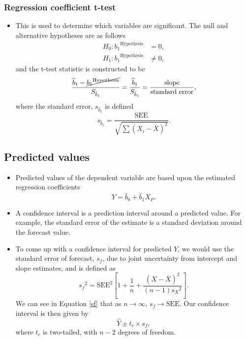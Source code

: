 \documentclass[../notes_compiled.tex]{subfiles}
\begin{document}
\subsubsection{Regression coefficient t-test}
\begin{itemize}
\item This is used to determine which variables are significant. The null and alternative hypotheses are as follows
\begin{align*}
H_{0}: {b_{1}}^{\text{Hypothesis}} &= 0, \\
H_{1}: {b_{1}}^{\text{Hypothesis}} &\neq 0,
\end{align*}
and the t-test statistic is constructed to be 
\begin{equation}
\frac{\widehat{b}_{1} - \cancel{{b_{1}}^{\text{Hypothesis}}}}{S_{\hat{b}_{1}}} = \frac{\widehat{b}_{1}}{S_{\hat{b}_{1}}} = \frac{\text{slope}}{\text{standard error}},
\end{equation}
where the standard error, $s_{\widehat{b}_{1}}$ is defined
\begin{equation}
s_{\hat{b}_{1}} = \frac{\mathrm{SEE}}{\sqrt{\sum(X_{i}-\overline{X})^{2}}}.
\end{equation}
\end{itemize}

\subsection{Predicted values}
\begin{itemize}
\item Predicted values of the dependent variable are based upon the estimated regression coefficients
\begin{equation}
\widehat{Y} = \widehat{b}_{0}+\widehat{b}_{1}X_{P}.
\end{equation}
\item A confidence interval is a prediction interval around a predicted value. For example, the standard error of the estimate is a standard deviation around the forecast value.
\item To come up with a confidence interval for predicted $Y$, we would use the standard error of forecast, $s_{f}$, due to joint uncertainty from intercept and slope estimates, and is defined as
\begin{equation}
{s_{f}}^{2} = \mathrm{SEE}^{2}\left[ 1+\frac{1}{n}+\frac{(X-\overline{X})^{2}}{(n-1){s_{X}}^{2}}\right]. \label{sf}
\end{equation}
We can see in Equation \ref{sf} that as $n\rightarrow\infty$, $s_{f}\rightarrow \mathrm{SEE}$. Our confidence interval is then given by
\begin{equation}
\widehat{Y}\pm t_{c}\times s_{f},
\end{equation}
where $t_{c}$ is two-tailed, with $n-2$ degrees of freedom. 
\end{itemize}
\end{document}
